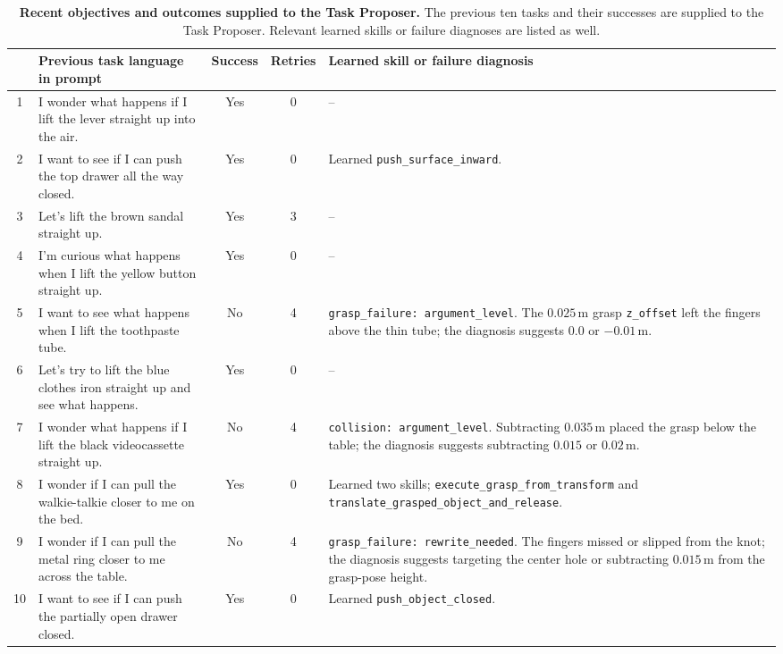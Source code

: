 \begin{table}[t]
\centering
\scriptsize
\setlength{\tabcolsep}{4pt}

\caption{
\textbf{Recent objectives and outcomes supplied to the Task Proposer.}
The previous ten tasks and their successes are supplied to the Task Proposer. Relevant learned skills or failure diagnoses are listed as well.
}
\label{tab:proposal_history}
\vspace{1.5em}
{\renewcommand{\arraystretch}{1.1}
\begin{tabular}{c p{} c c p{}}
\toprule
& \textbf{Previous task language in prompt} & \textbf{Success} &
\textbf{Retries} & \textbf{Learned skill or failure diagnosis} \\
\midrule
1 & I wonder what happens if I lift the lever straight up into the air. & Yes & 0 & -- \\
2 & I want to see if I can push the top drawer all the way closed. & Yes & 0 & Learned \texttt{push\_surface\_inward}. \\
3 & Let's lift the brown sandal straight up. & Yes & 3 & -- \\
4 & I'm curious what happens when I lift the yellow button straight up. & Yes & 0 & -- \\
5 & I want to see what happens when I lift the toothpaste tube. & No & 4 & \texttt{grasp\_failure: argument\_level}. The $0.025$\,m grasp \texttt{z\_offset} left the fingers above the thin tube; the diagnosis suggests $0.0$ or $-0.01$\,m. \\
6 & Let's try to lift the blue clothes iron straight up and see what happens. & Yes & 0 & -- \\
7 & I wonder what happens if I lift the black videocassette straight up. & No & 4 & \texttt{collision: argument\_level}. Subtracting $0.035$\,m placed the grasp below the table; the diagnosis suggests subtracting $0.015$ or $0.02$\,m. \\
8 & I wonder if I can pull the walkie-talkie closer to me on the bed. & Yes & 0 & Learned two skills; \texttt{execute\_grasp\_from\_transform} and \texttt{translate\_grasped\_object\_and\_release}. \\
9 & I wonder if I can pull the metal ring closer to me across the table. & No & 4 & \texttt{grasp\_failure: rewrite\_needed}. The fingers missed or slipped from the knot; the diagnosis suggests targeting the center hole or subtracting $0.015$\,m from the grasp-pose height. \\
10 & I want to see if I can push the partially open drawer closed. & Yes & 0 & Learned \texttt{push\_object\_closed}. \\
\bottomrule
\end{tabular}
}
\end{table}

